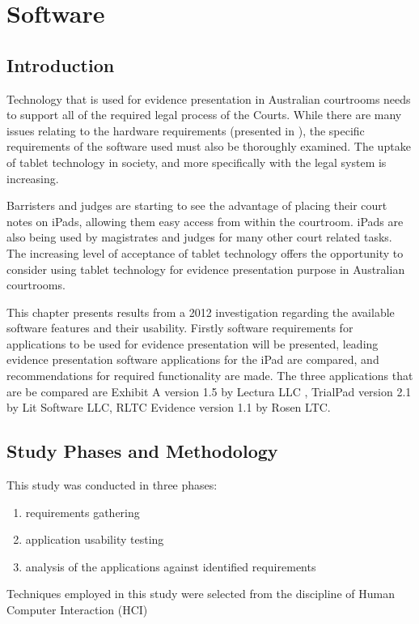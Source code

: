 


\chapter{Software\label{chap:Software}}


\section{Introduction}
\doublespace
Technology that is used for evidence presentation in Australian courtrooms needs to support all of the required legal process of the Courts. While there are many issues relating to the hardware requirements (presented in 
 ), the specific requirements of the software used must also be thoroughly examined. The uptake of tablet technology in society, and more specifically with the legal system is increasing.

Barristers and judges are starting to see the advantage of placing their court notes on iPads, allowing them easy access from within the courtroom. iPads are also being used by magistrates and judges for many other court related tasks. The increasing level of acceptance of tablet technology offers the opportunity to consider using tablet technology for evidence presentation purpose in Australian courtrooms.

This chapter presents results from a 2012 investigation regarding the available software features and their usability.
Firstly software requirements for applications to be used for evidence presentation will be presented, leading evidence presentation software applications for the iPad  are compared, and recommendations for required functionality are made.
The three applications that are be compared are Exhibit A version 1.5 by Lectura LLC ,  TrialPad version 2.1 by Lit Software LLC, RLTC Evidence version 1.1 by Rosen LTC.


\section{Study Phases and Methodology}
This study was conducted in three phases:
\begin{enumerate}
    \item requirements gathering
    \item application usability testing
    \item analysis of the applications against identified requirements
\end{enumerate} 
Techniques employed in this study were selected from the discipline of Human Computer Interaction (HCI) %
\citep{PreeceRogersSharp07}
\color{black}

